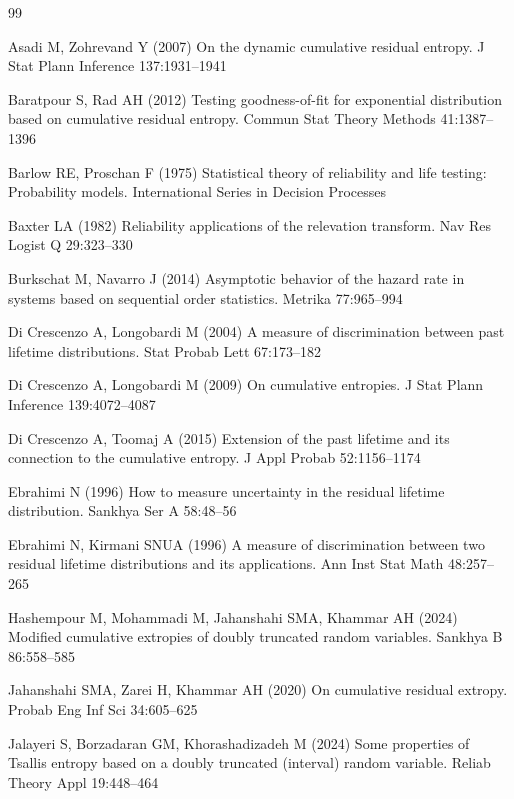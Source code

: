 \documentclass[11pt]{article}
\begin{document}
\begin{thebibliography}{99}

Asadi M, Zohrevand Y (2007) On the dynamic cumulative residual entropy. J Stat Plann Inference 137:1931--1941

Baratpour S, Rad AH (2012) Testing goodness-of-fit for exponential distribution based on cumulative residual entropy. Commun Stat Theory Methods 41:1387--1396

Barlow RE, Proschan F (1975) Statistical theory of reliability and life testing: Probability models. International Series in Decision Processes

Baxter LA (1982) Reliability applications of the relevation transform. Nav Res Logist Q 29:323--330

Burkschat M, Navarro J (2014) Asymptotic behavior of the hazard rate in systems based on sequential order statistics. Metrika 77:965--994

Di Crescenzo A, Longobardi M (2004) A measure of discrimination between past lifetime distributions. Stat Probab Lett 67:173--182

Di Crescenzo A, Longobardi M (2009) On cumulative entropies. J Stat Plann Inference 139:4072--4087

Di Crescenzo A, Toomaj A (2015) Extension of the past lifetime and its connection to the cumulative entropy. J Appl Probab 52:1156--1174

Ebrahimi N (1996) How to measure uncertainty in the residual lifetime distribution. Sankhya Ser A 58:48--56

Ebrahimi N, Kirmani SNUA (1996) A measure of discrimination between two residual lifetime distributions and its applications. Ann Inst Stat Math 48:257--265

Hashempour M, Mohammadi M, Jahanshahi SMA, Khammar AH (2024) Modified cumulative extropies of doubly truncated random variables. Sankhya B 86:558--585

Jahanshahi SMA, Zarei H, Khammar AH (2020) On cumulative residual extropy. Probab Eng Inf Sci 34:605--625

Jalayeri S, Borzadaran GM, Khorashadizadeh M (2024) Some properties of Tsallis entropy based on a doubly truncated (interval) random variable. Reliab Theory Appl 19:448--464


\end{thebibliography}
\end{document}
